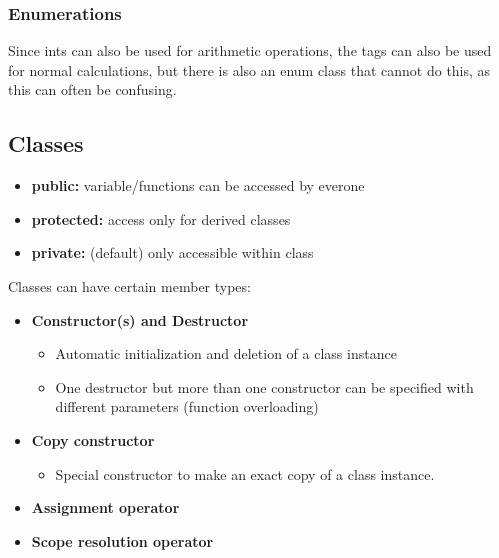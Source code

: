 \subsubsection{Enumerations}




Since ints can also be used for arithmetic operations, the tags can also be used for normal calculations, but there is also an enum class that cannot do this, as this can often be confusing.

\subsection{Classes}


\begin{itemize}
    \item \textbf{public:} variable/functions can be accessed by everone
    \item \textbf{protected:} access only for derived classes
    \item \textbf{private:} (default) only accessible within class
\end{itemize}

Classes can have certain member types:

\begin{itemize}
    \item \textbf{Constructor(s) and Destructor}
    \begin{itemize}
        \item Automatic initialization and deletion of a class instance
        \item One destructor but more than one constructor can be specified with different parameters (function overloading)
    \end{itemize}
    \item \textbf{Copy constructor}
    \begin{itemize}
        \item Special constructor to make an exact copy of a class instance.
    \end{itemize}
    \item \textbf{Assignment operator}
    \item \textbf{Scope resolution operator}
\end{itemize}

